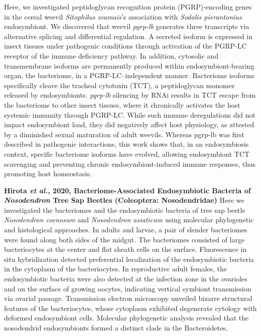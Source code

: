 \documentclass[11pt]{article}
\begin{document}
\begin{sloppypar}
Here, we investigated peptidoglycan recognition protein (PGRP)-encoding genes in the cereal weevil \textit{Sitophilus zeamais}’s association with \textit{Sodalis pierantonius} endosymbiont. 
We discovered that weevil \textit{pgrp-lb} generates three transcripts via alternative splicing and differential regulation. 
A secreted isoform is expressed in insect tissues under pathogenic conditions through activation of the PGRP-LC receptor of the immune deficiency pathway. 
In addition, cytosolic and transmembrane isoforms are permanently produced within endosymbiont-bearing organ, the bacteriome, in a PGRP-LC–independent manner. 
Bacteriome isoforms specifically cleave the tracheal cytotoxin (TCT), a peptidoglycan monomer released by endosymbionts. 
\textit{pgrp-lb} silencing by RNAi results in TCT escape from the bacteriome to other insect tissues, where it chronically activates the host systemic immunity through PGRP-LC. 
While such immune deregulations did not impact endosymbiont load, they did negatively affect host physiology, as attested by a diminished sexual maturation of adult weevils. 
Whereas pgrp-lb was first described in pathogenic interactions, this work shows that, in an endosymbiosis context, specific bacteriome isoforms have evolved, allowing endosymbiont TCT scavenging and preventing chronic endosymbiont-induced immune responses, thus promoting host homeostasis.
\par
\textbf{Hirota \textit{et al.}, 2020, Bacteriome-Associated Endosymbiotic Bacteria of \textit{Nosodendron} Tree Sap Beetles (Coleoptera: Nosodendridae)}
Here we investigated the bacteriomes and the endosymbiotic bacteria of tree sap beetle \textit{Nosodendron coenosum} and \textit{Nosodendron asiaticum} using molecular phylogenetic and histological approaches. 
In adults and larvae, a pair of slender bacteriomes were found along both sides of the midgut. 
The bacteriomes consisted of large bacteriocytes at the center and flat sheath cells on the surface. 
Fluorescence in situ hybridization detected preferential localization of the endosymbiotic bacteria in the cytoplasm of the bacteriocytes. 
In reproductive adult females, the endosymbiotic bacteria were also detected at the infection zone in the ovarioles and on the surface of growing oocytes, indicating vertical symbiont transmission via ovarial passage. 
Transmission electron microscopy unveiled bizarre structural features of the bacteriocytes, whose cytoplasm exhibited degenerate cytology with deformed endosymbiont cells. 
Molecular phylogenetic analysis revealed that the nosodendrid endosymbionts formed a distinct clade in the Bacteroidetes. 

\end{sloppypar}
\end{document}
